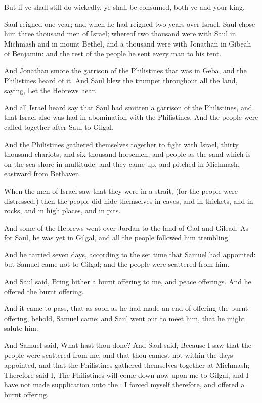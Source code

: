 \Verse But if ye shall still do wickedly, ye shall be consumed, both ye and your king.


\Chapter
\Verse Saul reigned one year; and when he had reigned two years over Israel, \Verse Saul chose him three thousand men of Israel; whereof two thousand were with Saul in Michmash and in mount Bethel, and a thousand were with Jonathan in Gibeah of Benjamin: and the rest of the people he sent every man to his tent.

\Verse And Jonathan smote the garrison of the Philistines that was in Geba, and the Philistines heard of it. And Saul blew the trumpet throughout all the land, saying, Let the Hebrews hear.

\Verse And all Israel heard say that Saul had smitten a garrison of the Philistines, and that Israel also was had in abomination with the Philistines. And the people were called together after Saul to Gilgal.

\Verse And the Philistines gathered themselves together to fight with Israel, thirty thousand chariots, and six thousand horsemen, and people as the sand which is on the sea shore in multitude: and they came up, and pitched in Michmash, eastward from Bethaven.

\Verse When the men of Israel saw that they were in a strait, (for the people were distressed,) then the people did hide themselves in caves, and in thickets, and in rocks, and in high places, and in pits.

\Verse And some of the Hebrews went over Jordan to the land of Gad and Gilead. As for Saul, he was yet in Gilgal, and all the people followed him trembling.

\Verse And he tarried seven days, according to the set time that Samuel had appointed: but Samuel came not to Gilgal; and the people were scattered from him.

\Verse And Saul said, Bring hither a burnt offering to me, and peace offerings. And he offered the burnt offering.

\Verse And it came to pass, that as soon as he had made an end of offering the burnt offering, behold, Samuel came; and Saul went out to meet him, that he might salute him.

\Verse And Samuel said, What hast thou done? And Saul said, Because I saw that the people were scattered from me, and that thou camest not within the days appointed, and that the Philistines gathered themselves together at Michmash; \Verse Therefore said I, The Philistines will come down now upon me to Gilgal, and I have not made supplication unto the \LORD: I forced myself therefore, and offered a burnt offering.

